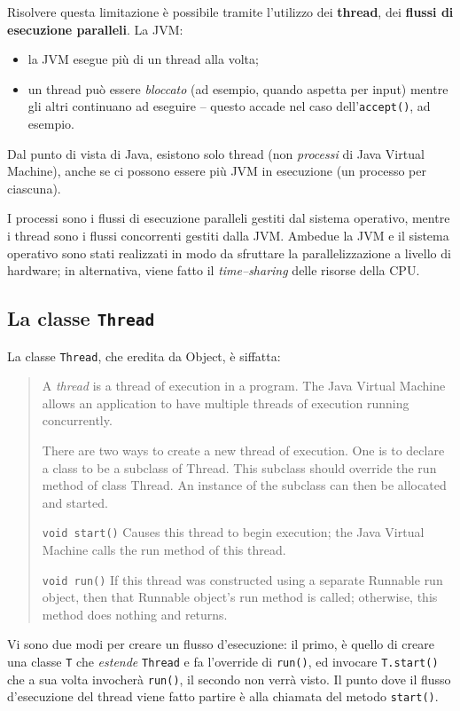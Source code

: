 \documentclass[\fontsizeclass,twocolumn]{\classname}
\theoremstyle{definition}
\theoremstyle{definition}
\begin{document}
Risolvere questa limitazione è possibile tramite l'utilizzo dei
\textbf{thread}, dei \textbf{flussi di esecuzione paralleli}. La JVM:

\begin{itemize}
    \item la JVM esegue più di un thread alla volta;
    \item un thread può essere \emph{bloccato} (ad esempio, quando aspetta per
        input) mentre gli altri continuano ad eseguire -- questo accade nel
        caso dell'\texttt{ac\-cept()}, ad esempio.
\end{itemize}

Dal punto di vista di Java, esistono solo thread (non \emph{processi} di Java
Virtual Machine), anche se ci possono essere più JVM in esecuzione (un processo
per ciascuna). 

I processi sono i flussi di esecuzione paralleli gestiti dal sistema operativo,
mentre i thread sono i flussi concorrenti gestiti dalla JVM. Ambedue la JVM e
il sistema operativo sono stati realizzati in modo da sfruttare la
parallelizzazione a livello di hardware; in alternativa, viene fatto il
\emph{time--sharing} delle risorse della CPU.

\subsection{La classe \texttt{Thread}}

La classe \texttt{Thread}, che eredita da Object, è siffatta:
\begin{quote}
    \footnotesize{A \emph{thread} is a thread of execution in a program. The Java Virtual Machine allows an application to have multiple threads of execution running concurrently.

There are two ways to create a new thread of execution. One is to declare a class to be a subclass of Thread. This subclass should override the run method of class Thread. An instance of the subclass can then be allocated and started.

\texttt{void 	start()} 	Causes this thread to begin execution; the Java Virtual Machine calls the run method of this thread.

\texttt{void 	run()} 	If this thread was constructed using a separate Runnable run object, then that Runnable object's run method is called; otherwise, this method does nothing and returns.}
\end{quote}

Vi sono due modi per creare un flusso d'esecuzione: il primo, è quello di
creare una classe \texttt{T} che \emph{estende} \texttt{Thread} e fa l'override
di \texttt{run()}, ed invocare \texttt{T.start()} che a sua volta invocherà
\texttt{run()}, il secondo non verrà visto. Il punto dove il flusso
d'esecuzione del thread viene fatto partire è alla chiamata del metodo
\texttt{start()}.
\end{document}
